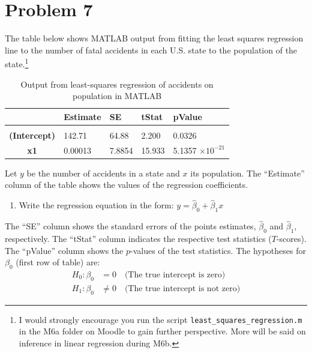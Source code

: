 \documentclass[11pt,twoside]{article}
\newcommand{\pts}[1]{\marginpar{ \small\hspace{0pt} \textit{[#1]} } }
\numberwithin{equation}{section}
\newcommand{\?}{\stackrel{?}{=}}
\begin{document}
\section*{Problem 7 }

The table below shows MATLAB output from fitting the least squares regression line to the number of fatal accidents in
each U.S. state to the population of the state.\footnote{I would strongly encourage you run the script
  \texttt{least\_squares\_regression.m} in the M6a folder on Moodle to gain further perspective. More will be said on
  inference in linear regression during M6b.}

\begin{table}[h!]
  \centering
  \begin{tabular}{c l l l l}
    &  \bf Estimate & \bf SE & \bf tStat & \bf pValue \\\midrule \\
    \bf (Intercept) & 142.71 & 64.88  & 2.200  & 0.0326 \\
    \bf x1 & 0.00013 & 7.8854 & 15.933 & 5.1357 $\times 10^{-21}$ \\ 
  \end{tabular}
  \caption{Output from least-squares regression of accidents on population in MATLAB}
  \label{tab:p5}
\end{table}
\noindent Let $y$ be the number of accidents in a state and $x$ its population. The ``Estimate'' column of the table shows the values of the regression coefficients.

\begin{enumerate}[\bf (a)]
\item   Write the regression equation in the form: $y = \hat\beta_0 + \hat\beta_1 x$ \pts{2}
  \vspace{15ex}
  
\end{enumerate}

\noindent  The ``SE'' column shows the standard errors of the points estimates, $\hat\beta_0$ and $\hat\beta_1$, respectively. The ``tStat'' column indicates the respective test statistics ($T$-scores). The ``pValue'' column shows the $p$-values of the test statistics. The hypotheses for $\beta_0$ (first row of table) are:
 \begin{align*}
   H_0: \beta_0 &= 0 \quad \text{(The true intercept is zero)} \\
   H_1 : \beta_0 &\ne 0 \quad \text{(The true intercept is not zero)}
 \end{align*}
 
\end{document}
